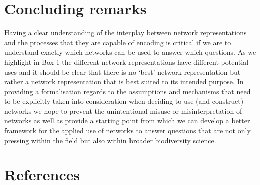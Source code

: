 \documentclass[
]{article}
\begin{document}
\section{Concluding remarks}\label{concluding-remarks}

Having a clear understanding of the interplay between network
representations and the processes that they are capable of encoding is
critical if we are to understand exactly which networks can be used to
answer which questions. As we highlight in Box 1 the different network
representations have different potential uses and it should be clear
that there is no `best' network representation but rather a network
representation that is best suited to its intended purpose. In providing
a formalisation regards to the assumptions and mechanisms that need to
be explicitly taken into consideration when deciding to use (and
construct) networks we hope to prevent the unintentional misuse or
misinterpretation of networks as well as provide a starting point from
which we can develop a better framework for the applied use of networks
to answer questions that are not only pressing within the field but also
within broader biodiversity science.

\section*{References}\label{references}
\end{document}
